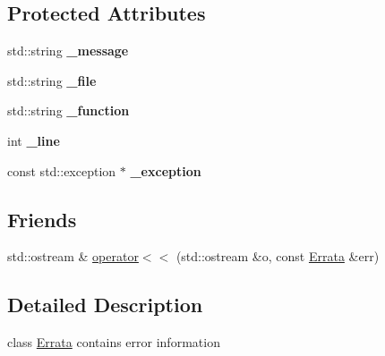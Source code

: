 \subsection*{Protected Attributes}
\begin{DoxyCompactItemize}
\item 
std\+::string {\bfseries \+\_\+message}\hypertarget{class_c_l_ray_tracer_1_1_common_1_1_errata_a7f0e72789382e50ca6e2d3ca4a2b8baf}{}\label{class_c_l_ray_tracer_1_1_common_1_1_errata_a7f0e72789382e50ca6e2d3ca4a2b8baf}

\item 
std\+::string {\bfseries \+\_\+file}\hypertarget{class_c_l_ray_tracer_1_1_common_1_1_errata_a242971b1502aff099c0e4d3b8fea0ea4}{}\label{class_c_l_ray_tracer_1_1_common_1_1_errata_a242971b1502aff099c0e4d3b8fea0ea4}

\item 
std\+::string {\bfseries \+\_\+function}\hypertarget{class_c_l_ray_tracer_1_1_common_1_1_errata_a7bda3dff0ec7f87a6ec98a02e245577e}{}\label{class_c_l_ray_tracer_1_1_common_1_1_errata_a7bda3dff0ec7f87a6ec98a02e245577e}

\item 
int {\bfseries \+\_\+line}\hypertarget{class_c_l_ray_tracer_1_1_common_1_1_errata_afdad0aa0eb34bc2d3ae5a091ddf941bd}{}\label{class_c_l_ray_tracer_1_1_common_1_1_errata_afdad0aa0eb34bc2d3ae5a091ddf941bd}

\item 
const std\+::exception $\ast$ {\bfseries \+\_\+exception}\hypertarget{class_c_l_ray_tracer_1_1_common_1_1_errata_aa0259f6c7a94ddd36ba05aec55ed04d4}{}\label{class_c_l_ray_tracer_1_1_common_1_1_errata_aa0259f6c7a94ddd36ba05aec55ed04d4}

\end{DoxyCompactItemize}
\subsection*{Friends}
\begin{DoxyCompactItemize}
\item 
std\+::ostream \& \hyperlink{class_c_l_ray_tracer_1_1_common_1_1_errata_a1b48ba32371d5121491672883a100d43}{operator$<$$<$} (std\+::ostream \&o, const \hyperlink{class_c_l_ray_tracer_1_1_common_1_1_errata}{Errata} \&err)
\end{DoxyCompactItemize}


\subsection{Detailed Description}
class \hyperlink{class_c_l_ray_tracer_1_1_common_1_1_errata}{Errata} contains error information 

